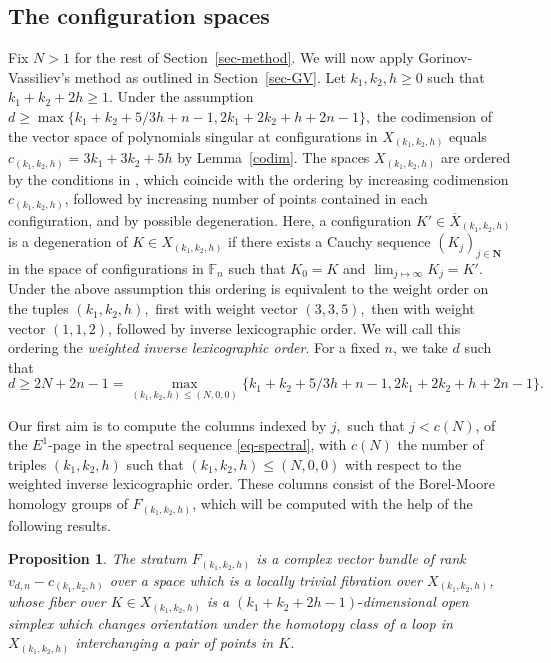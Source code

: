\documentclass[10pt,a4paper,twoside]{amsart}
\theoremstyle{plain}
\newtheorem{prop}[theo]{Proposition}
\theoremstyle{definition}
\theoremstyle{remark}
\begin{document}
\subsection{The configuration spaces}\label{sec5_1}
Fix $N>1$ 
for the rest of Section~\ref{sec-method}. We will now apply Gorinov-Vassiliev's method as outlined in Section~\ref{sec-GV}. 
Let $k_1,k_2,h\geq 0$ such that $k_1+k_2+2h\geq1$. Under the assumption $d\geq \operatorname{max}\{k_1+k_2+5/3h+n-1,2k_1+2k_2+h+2n-1\},$ the codimension of the vector space of polynomials singular at configurations in $X_{(k_1,k_2,h)}$ equals $c_{(k_1,k_2,h)}=3k_1+3k_2+5h$ by Lemma~\ref{codim}. 
The spaces $X_{(k_1,k_2,h)}$ are ordered by the conditions in \cite[List 2.3]{TomM4}, which coincide with the ordering by increasing codimension $c_{(k_1,k_2,h)}$, followed by increasing number of points contained in each configuration, and by possible degeneration. 
Here, a configuration $K'\in\overline{X}_{(k_1,k_2,h)}$ is a degeneration of $K\in X_{(k_1,k_2,h)}$ if there exists a Cauchy sequence $(K_j)_{j\in\mathbf{N}}$ in the space of configurations in $\mathbb{F}_n$ such that $K_0=K$ and $\lim_{j\mapsto\infty} K_j=K'$. 
Under the above assumption this ordering is equivalent to the weight order on the tuples $(k_1,k_2,h),$ first with weight vector $(3,3,5),$ then with weight vector $(1,1,2)$, followed by inverse lexicographic order. 
We will call this ordering the \emph{weighted inverse lexicographic order}. 
For a fixed $n$, we take $d$ such that \begin{displaymath}d\geq  2N+2n-1 = \operatorname{max}_{(k_1,k_2,h)\leq(N,0,0)}\{k_1+k_2+5/3h+n-1,2k_1+2k_2+h+2n-1\}.
\end{displaymath}

Our first aim is to compute the columns indexed by $j,$ such that $j< c(N)$, of the $E^1$-page in the spectral sequence \eqref{eq-spectral}, with $c(N)$ the number of triples $(k_1,k_2,h)$ such that $(k_1,k_2,h)\leq(N,0,0)$ with respect to the weighted inverse lexicographic order.
These columns consist of the Borel-Moore homology groups of $F_{(k_1,k_2,h)}$, which will be computed with the help of the following results.

\begin{prop}{\cite[Theorem 2.8, Lemmas 2.10 and 2.11]{Gor}}\label{propGor}
The stratum $F_{(k_1,k_2,h)}$ is a complex vector bundle of rank $v_{d,n}-c_{(k_1,k_2,h)}$ over a space which is a locally trivial fibration over $X_{(k_1,k_2,h)}$, whose fiber over $K\in X_{(k_1,k_2,h)}$ is a $(k_1+k_2+2h-1)\mbox{-}$dimensional open simplex which changes orientation under the homotopy class of a loop in $X_{(k_1,k_2,h)}$ interchanging a pair of points in $K$.
\end{prop}
\end{document}
